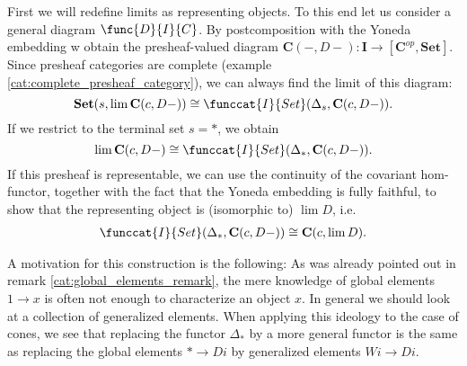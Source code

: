     First we will redefine limits as representing objects. To this end let us consider a general diagram $\func{D}{I}{C}$. By postcomposition with the Yoneda embedding w obtain the presheaf-valued diagram $\mathbf{C}(-, D-):\mathbf{I}\rightarrow[\mathbf{C}^{op}, \mathbf{Set}]$. Since presheaf categories are complete (example \ref{cat:complete_presheaf_category}), we can always find the limit of this diagram: \[\mathbf{Set}(s, \lim\mathbf{C}(c, D-))\cong\funccat{I}{Set}(\Delta_s, \mathbf{C}(c, D-)).\] If we restrict to the terminal set $s=\ast$, we obtain \[\lim\mathbf{C}(c, D-)\cong\funccat{I}{Set}(\Delta_\ast, \mathbf{C}(c, D-)).\] If this presheaf is representable, we can use the continuity of the covariant hom-functor, together with the fact that the Yoneda embedding is fully faithful, to show that the representing object is (isomorphic to) $\lim D$, i.e.
    \begin{gather}
        \funccat{I}{Set}(\Delta_\ast, \mathbf{C}(c, D-))\cong\mathbf{C}(c, \lim D).
    \end{gather}


    \begin{remark}
        A motivation for this construction is the following: As was already pointed out in remark \ref{cat:global_elements_remark}, the mere knowledge of global elements $1\rightarrow x$ is often not enough to characterize an object $x$. In general we should look at a collection of generalized elements. When applying this ideology to the case of cones, we see that replacing the functor $\Delta_\ast$ by a more general functor is the same as replacing the global elements $\ast\rightarrow Di$ by generalized elements $Wi\rightarrow Di$.
    \end{remark}

